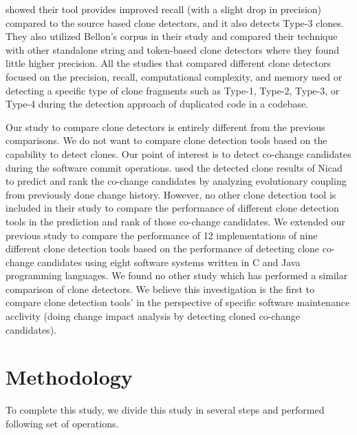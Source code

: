 \documentclass[review]{elsarticle}
\begin{document}
\citet{CloneIntermediateRepresentationBallon} showed their tool provides improved recall (with a slight drop in precision) compared to the source based clone detectors, and it also detects Type-3 clones. They also utilized Bellon’s corpus in their study and compared their technique with other standalone string and token-based clone detectors where they found little higher precision. All the studies that compared different clone detectors focused on the precision, recall, computational complexity, and memory used or detecting a specific type of clone fragments such as Type-1, Type-2, Type-3, or Type-4 during the detection approach of duplicated code in a codebase. 

Our study to compare clone detectors is entirely different from the previous comparisons. We do not want to compare clone detection tools based on the capability to detect clones. Our point of interest is to detect co-change candidates during the software commit operations. \citet{Mondal-2014-PRC-2597073-2597104rankingCoChange} used the detected clone results of Nicad to predict and rank the co-change candidates by analyzing evolutionary coupling from previously done change history. However, no other clone detection tool is included in their study to compare the performance of different clone detection tools in the prediction and rank of those co-change candidates. We extended our previous study \cite{nadim-iwsc-2020} to compare the performance of 12 implementations of nine different clone detection tools based on the performance of detecting clone co-change candidates using eight software systems written in C and Java programming languages.  We found no other study which has performed a similar comparison of clone detectors. We believe this investigation is the first to compare clone detection tools' in the perspective of specific software maintenance acclivity (doing change impact analysis by detecting cloned co-change candidates). 

\section{Methodology}
\label{the-methodology}
To complete this study, we divide this study in several steps and performed following set of operations. 
\end{document}
